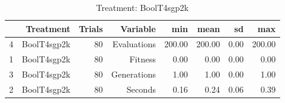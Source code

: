 \begin{table}[ht]
\centering
\begin{tabular}{rrrrrrrr}
  \hline
 & Treatment & Trials & Variable & min & mean & sd & max \\ 
  \hline
4 & BoolT4sgp2k &  80 & Evaluations & 200.00 & 200.00 & 0.00 & 200.00 \\ 
  1 & BoolT4sgp2k &  80 & Fitness & 0.00 & 0.00 & 0.00 & 0.00 \\ 
  3 & BoolT4sgp2k &  80 & Generations & 1.00 & 1.00 & 0.00 & 1.00 \\ 
  2 & BoolT4sgp2k &  80 & Seconds & 0.16 & 0.24 & 0.06 & 0.39 \\ 
   \hline
\end{tabular}
\caption{Treatment: BoolT4sgp2k} 
\end{table}
